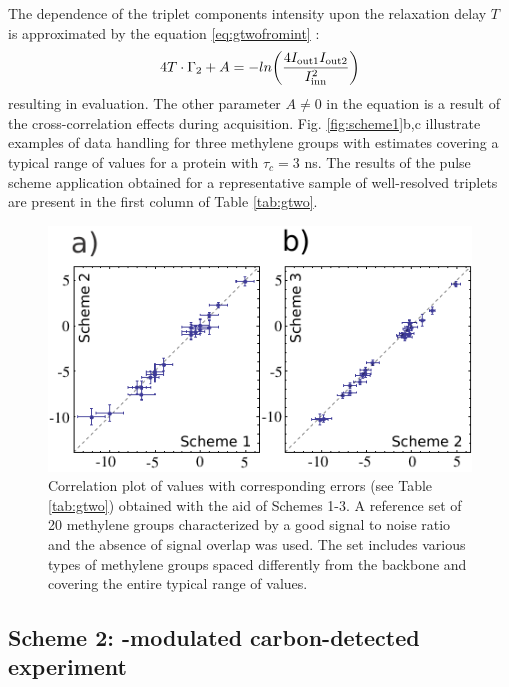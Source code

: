 \documentclass[twocolumn]{svjour3}           %
\begin{document}
The dependence of the triplet components intensity 
upon the relaxation delay $T$ is 
approximated by the equation  \eqref{eq:gtwofromint}
\cite{zheng_measurement_2004,carlomagno_errors_2000}: 
\begin{equation}
\label{eq:sch1:intensity}
  4 T \cdot \Gamma_2 + A = - ln\biggl(\frac{4 I_\textrm{out1} I_\textrm{out2}}{I_\textrm{inn}^2}\biggr)
\end{equation}
resulting in \gtwo{} evaluation. The other parameter $A \ne 0$ in the 
equation is a result of the cross-correlation effects during \clab{} 
acquisition. Fig. \ref{fig:scheme1}b,c illustrate examples of data 
handling for three  methylene groups with \gtwo{} estimates covering a 
typical range of values for a protein with $\tau_c = 3$ ns. The results 
of the pulse scheme application obtained for a representative sample of
well-resolved \clab{} triplets are present in the first column of Table 
\ref{tab:gtwo}. 

\begin{figure}
    \includegraphics[width=\columnwidth]{Fig5}
    \caption{
    Correlation plot of \gtwoCH{} values with corresponding errors (see Table \ref{tab:gtwo}) obtained with the aid of Schemes 1-3. A reference set of 20 methylene groups characterized by a good signal to noise ratio and the absence of signal overlap was used. The set includes various types of methylene groups spaced differently from the backbone and covering the entire typical range of values.}
    \label{fig:cp}
\end{figure}

\subsection{Scheme 2: \oneJch-modulated carbon-detected experiment}
\label{subseq:scheme2}
\end{document}
